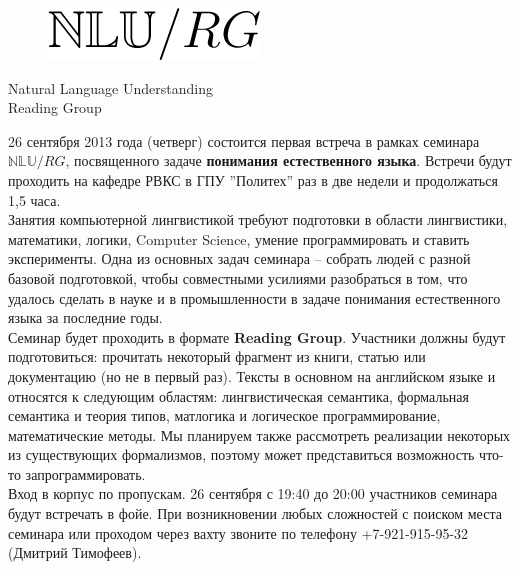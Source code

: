\documentclass[12pt]{article}
\begin{document}
\baselineskip 24pt

\parindent 0.0cm

\begin{figure}
  \begin{center}
    \includegraphics[scale=0.75]{nlu-rg-logo.png}
  \end{center}
\end{figure}

\begin{center}
{\rm \Huge{Natural Language Understanding}}\\
\bigskip
{\rm \Large Reading Group}
\end{center}

\bigskip

\baselineskip 15pt

26 сентября 2013 года (четверг) состоится первая встреча в рамках семинара $\mathbb{NLU}/RG$, посвященного задаче \textbf{понимания естественного языка}. Встречи будут проходить на кафедре РВКС в ГПУ ''Политех'' раз в две недели и продолжаться 1,5 часа.\\

Занятия компьютерной лингвистикой требуют подготовки в области лингвистики, математики, логики, Computer Science, умение программировать и ставить эксперименты. Одна из основных задач семинара -- собрать людей с разной базовой подготовкой, чтобы совместными усилиями разобраться в том, что удалось сделать в науке и в промышленности в задаче понимания естественного языка за последние годы.\\

Семинар будет проходить в формате \textbf{Reading Group}. Участники должны будут подготовиться: прочитать некоторый фрагмент из книги, статью или документацию (но не в первый раз). Тексты в основном на английском языке и относятся к следующим областям: лингвистическая семантика, формальная семантика и теория типов, матлогика и логическое программирование, математические методы. Мы планируем также рассмотреть реализации некоторых из существующих формализмов, поэтому может представиться возможность что-то запрограммировать.\\

Вход в корпус по пропускам. 26 сентября с 19:40 до 20:00 участников семинара будут встречать в фойе. При возникновении любых сложностей с поиском места семинара или проходом через вахту звоните по телефону +7-921-915-95-32 (Дмитрий Тимофеев).\\
\end{document}
